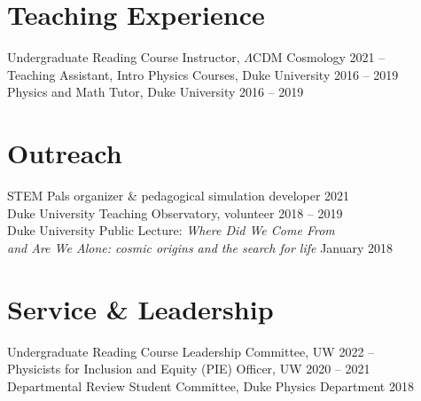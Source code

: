 \documentclass[margin]{res}
\begin{document}
\begin{resume}
\section{Teaching Experience}

Undergraduate Reading Course Instructor, $\Lambda$CDM Cosmology \hfill 2021 -- \\
Teaching Assistant, Intro Physics Courses, Duke University \hfill 2016 -- 2019 \\
Physics and Math Tutor, Duke University \hfill 2016 -- 2019 \\

\section{Outreach}

STEM Pals organizer \& pedagogical simulation developer  \hfill 2021 \\
Duke University Teaching Observatory, volunteer \hfill 2018 -- 2019 \\
Duke University Public Lecture: \textit{Where Did We Come From} \\
\hspace*{4mm} \textit{and Are We Alone: cosmic origins and the search for life} \hfill January 2018



\section{Service \& Leadership}

Undergraduate Reading Course Leadership Committee, UW \hfill 2022 -- \\
Physicists for Inclusion and Equity (PIE) Officer, UW \hfill 2020 -- 2021 \\
Departmental Review Student Committee, Duke Physics Department \hfill 2018 \\



\end{resume}
\end{document}
